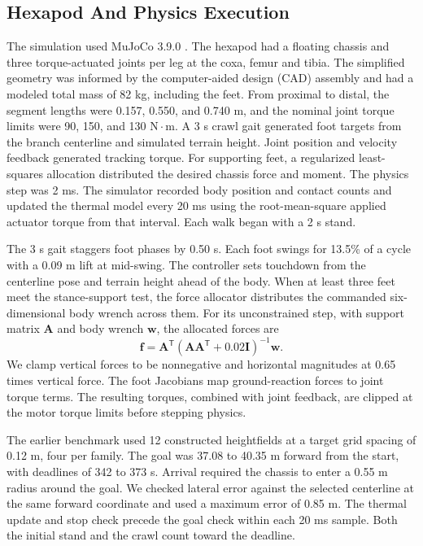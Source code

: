 \documentclass{ieeeaccess}
\begin{document}
\subsection{Hexapod And Physics Execution}

The simulation used MuJoCo 3.9.0 \cite{todorov2012}. The hexapod had a floating chassis and three torque-actuated joints per leg at the coxa, femur and tibia. The simplified geometry was informed by the computer-aided design (CAD) assembly and had a modeled total mass of 82 kg, including the feet. From proximal to distal, the segment lengths were 0.157, 0.550, and 0.740 m, and the nominal joint torque limits were 90, 150, and 130 $\mathrm{N}{\cdot}\mathrm{m}$. A 3 s crawl gait generated foot targets from the branch centerline and simulated terrain height. Joint position and velocity feedback generated tracking torque. For supporting feet, a regularized least-squares allocation distributed the desired chassis force and moment. The physics step was 2 ms. The simulator recorded body position and contact counts and updated the thermal model every 20 ms using the root-mean-square applied actuator torque from that interval. Each walk began with a 2 s stand.

The 3 s gait staggers foot phases by 0.50 s. Each foot swings for 13.5\% of a cycle with a 0.09 m lift at mid-swing. The controller sets touchdown from the centerline pose and terrain height ahead of the body. When at least three feet meet the stance-support test, the force allocator distributes the commanded six-dimensional body wrench across them. For its unconstrained step, with support matrix $\mathbf{A}$ and body wrench $\mathbf{w}$, the allocated forces are
\begin{equation}
\mathbf{f}=\mathbf{A}^{\mathsf T}
   \left(\mathbf{A}\mathbf{A}^{\mathsf T}
    +0.02\mathbf{I}\right)^{-1}\mathbf{w}.
\end{equation}
We clamp vertical forces to be nonnegative and horizontal magnitudes at 0.65 times vertical force. The foot Jacobians map ground-reaction forces to joint torque terms. The resulting torques, combined with joint feedback, are clipped at the motor torque limits before stepping physics.

The earlier benchmark used 12 constructed heightfields at a target grid spacing of 0.12 m, four per family. The goal was 37.08 to 40.35 m forward from the start, with deadlines of 342 to 373 s. Arrival required the chassis to enter a 0.55 m radius around the goal. We checked lateral error against the selected centerline at the same forward coordinate and used a maximum error of 0.85 m. The thermal update and stop check precede the goal check within each 20 ms sample. Both the initial stand and the crawl count toward the deadline.
\end{document}
